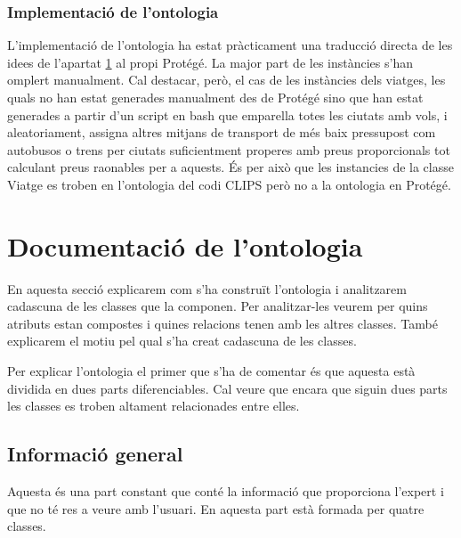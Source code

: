 \documentclass[11pt,a4paper]{article}
\begin{document}
\subsubsection{Implementació de l'ontologia}
L'implementació de l'ontologia ha estat pràcticament una traducció directa de les idees de l'apartat \ref{sec:ontologia} al propi Protégé. La major part de les instàncies s'han omplert manualment. Cal destacar, però, el cas de les instàncies dels viatges, les quals no han estat generades manualment des de Protégé sino que han estat generades a partir d'un script en bash que emparella totes les ciutats amb vols, i aleatoriament, assigna altres mitjans de transport de més baix pressupost com autobusos o trens per ciutats suficientment properes amb preus proporcionals tot calculant preus raonables per a aquests. És per això que les instancies de la classe Viatge es troben en l'ontologia del codi CLIPS però no a la ontologia en Protégé.


\clearpage


\section{Documentació de l'ontologia}%
\label{sec:ontologia}
En aquesta secció explicarem com s'ha construït l'ontologia i analitzarem cadascuna de les classes que la componen. Per analitzar-les veurem per quins atributs estan compostes i quines relacions tenen amb les altres classes. També explicarem el motiu pel qual s'ha creat cadascuna de les classes.

Per explicar l'ontologia el primer que s'ha de comentar és que aquesta està dividida en dues parts diferenciables. Cal veure que encara que siguin dues parts les classes es troben altament relacionades entre elles.

\subsection{Informació general}
Aquesta és una part constant que conté la informació que proporciona l'expert i que no té res a veure amb l'usuari. En aquesta part està formada per quatre classes.
\end{document}
